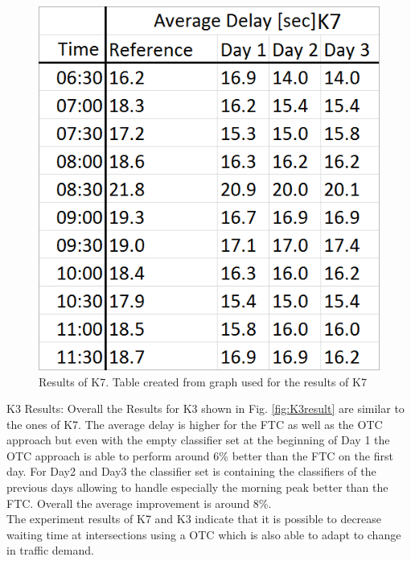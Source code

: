 \begin{figure} [!htb]
	\centering
	\includegraphics[scale=0.60]{pic/K7_ResultTable.png}
	\caption{Results of K7. Table created from graph used for the results of K7 \cite{organic1}}
	\label{fig:K7result}
\end{figure}

K3 Results: Overall the Results for K3 shown in Fig. \ref{fig:K3result} are similar to the ones of K7. The average delay is higher for the FTC as well as the OTC approach but even with the empty classifier set at the beginning of Day 1 the OTC approach is able to perform around 6\% better than the FTC on the first day. For Day2 and Day3 the classifier set is containing the classifiers of the previous days allowing to handle especially the morning peak better than the FTC. Overall the average improvement is around 8\%.\cite{organic1}\ \\

The experiment results of K7 and K3 indicate that it is possible to decrease waiting time at intersections using a OTC which is also able to adapt to change in traffic demand.


